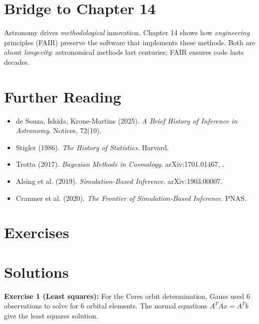 \section{Bridge to Chapter 14}
\label{sec:astro:bridge}

Astronomy drives \emph{methodological} innovation. Chapter 14 shows how \emph{engineering} principles (FAIR) preserve the software that implements these methods. Both are about \emph{longevity}: astronomical methods last centuries; FAIR ensures code lasts decades.

\section{Further Reading}
\label{sec:astro:refs}

\begin{itemize}
    \item de Souza, Ishida, Krone-Martins (2025). \textit{A Brief History of Inference in Astronomy}. Notices, 72(10).
    \item Stigler (1986). \textit{The History of Statistics}. Harvard.
    \item Trotta (2017). \textit{Bayesian Methods in Cosmology}. arXiv:1701.01467, \cite{desouza2025astronomy}.
    \item Alsing et al. (2019). \textit{Simulation-Based Inference}. arXiv:1903.00007.
    \item Cranmer et al. (2020). \textit{The Frontier of Simulation-Based Inference}. PNAS.
\end{itemize}

\section{Exercises}
\section{Solutions}
\label{sec:astro:solutions}

\begin{solution}
\textbf{Exercise 1 (Least squares):} For the Ceres orbit determination, Gauss used 6 observations to solve for 6 orbital elements. The normal equations $A^T A x = A^T b$ give the least squares solution.
\end{solution}

